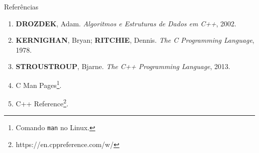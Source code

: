\begin{frame}[fragile]{Referências}

    \begin{enumerate}
        \item \textbf{DROZDEK}, Adam. \textit{Algoritmos e Estruturas de Dados em C++}, 2002.

        \item \textbf{KERNIGHAN}, Bryan; \textbf{RITCHIE}, Dennis. \textit{The C Programming Language}, 1978.

        \item \textbf{STROUSTROUP}, Bjarne. \textit{The C++ Programming Language}, 2013.

        \item C Man Pages\footnote{Comando \texttt{man} no Linux.}.

		\item C++ Reference\footnote{https://en.cppreference.com/w/}.
    \end{enumerate}

\end{frame}
